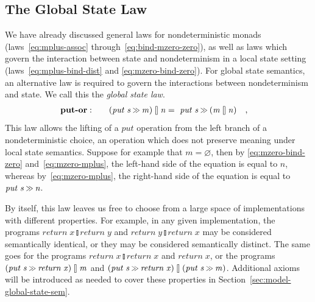 \documentclass{llncs}
\newcommand{\Varid}[1]{\mathit{#1}}
\let\Varid\mathit
\begin{document}
\subsection{The Global State Law}
\label{sec:laws-global-state}
We have already discussed general laws for nondeterministic monads
(laws~\eqref{eq:mplus-assoc} through~\eqref{eq:bind-mzero-zero}),
as well as laws which govern the interaction between state and nondeterminism in
a local state setting (laws~\eqref{eq:mplus-bind-dist} and
\eqref{eq:mzero-bind-zero}).
For global state semantics, an alternative law is required to govern the
interactions between nondeterminism and state.
We call this the \emph{global state law}.
\begin{alignat}{2}
&\mbox{\bf put-or}:\quad&
  \ensuremath{(\Varid{put}\;\Varid{s}\mathbin{\hstretch{0.7}{>\!\!>}}\Varid{m})\mathbin{\talloblong}\Varid{n}} &=~ \ensuremath{\Varid{put}\;\Varid{s}\mathbin{\hstretch{0.7}{>\!\!>}}(\Varid{m}\mathbin{\talloblong}\Varid{n})}~ \mbox{~~,}
    \label{eq:put-or}
\end{alignat}
This law allows the lifting of a \ensuremath{\Varid{put}} operation from the left
branch of a nondeterministic choice, an operation which does not preserve
meaning under local state semantics.
Suppose for example that \ensuremath{\Varid{m}\mathrel{=}\Varid{\varnothing}}, then by
\eqref{eq:mzero-bind-zero} and~\eqref{eq:mzero-mplus}, the left-hand side of
the equation is equal to \ensuremath{\Varid{n}}, whereas by~\eqref{eq:mzero-mplus},
the right-hand side of the equation is equal to \ensuremath{\Varid{put}\;\Varid{s}\mathbin{\hstretch{0.7}{>\!\!>}}\Varid{n}}.

By itself, this law leaves us free to choose from a large space of
implementations with different properties.
For example, in any given implementation, the programs \ensuremath{\Varid{return}\;\Varid{x}\mathbin{\talloblong}\Varid{return}\;\Varid{y}} and
\ensuremath{\Varid{return}\;\Varid{y}\mathbin{\talloblong}\Varid{return}\;\Varid{x}} may be considered semantically identical, or they may be
considered semantically distinct.
The same goes for the programs \ensuremath{\Varid{return}\;\Varid{x}\mathbin{\talloblong}\Varid{return}\;\Varid{x}} and \ensuremath{\Varid{return}\;\Varid{x}},
or the programs \ensuremath{(\Varid{put}\;\Varid{s}\mathbin{\hstretch{0.7}{>\!\!>}}\Varid{return}\;\Varid{x})\mathbin{\talloblong}\Varid{m}} and
\ensuremath{(\Varid{put}\;\Varid{s}\mathbin{\hstretch{0.7}{>\!\!>}}\Varid{return}\;\Varid{x})\mathbin{\talloblong}(\Varid{put}\;\Varid{s}\mathbin{\hstretch{0.7}{>\!\!>}}\Varid{m})}.
Additional axioms will be introduced as needed to cover these properties in
Section~\ref{sec:model-global-state-sem}.
\end{document}
